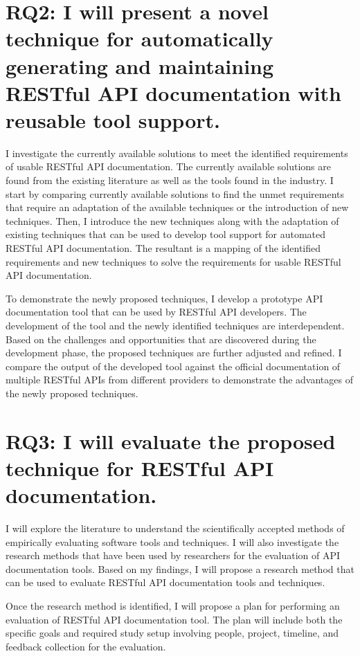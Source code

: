 \documentclass[11pt,oneside]{book}
\begin{document}
\section{RQ2: I will present a novel technique for automatically generating and maintaining RESTful API documentation with reusable tool support.}

I investigate the currently available solutions to meet the identified requirements of usable RESTful API documentation. The currently available solutions are found from the existing literature as well as the tools found in the industry. I start by comparing currently available solutions to find the unmet requirements that require an adaptation of the available techniques or the introduction of new techniques. Then, I introduce the new techniques along with the adaptation of existing techniques that can be used to develop tool support for automated RESTful API documentation. The resultant is a mapping of the identified requirements and new techniques to solve the requirements for usable RESTful API documentation.

To demonstrate the newly proposed techniques, I develop a prototype API documentation tool that can be used by RESTful API developers. The development of the tool and the newly identified techniques are interdependent. Based on the challenges and opportunities that are discovered during the development phase, the proposed techniques are further adjusted and refined. I compare the output of the developed tool against the official documentation of multiple RESTful APIs from different providers to demonstrate the advantages of the newly proposed techniques.

\section{RQ3: I will evaluate the proposed technique for RESTful API documentation.}

I will explore the literature to understand the scientifically accepted methods of empirically evaluating software tools and techniques. I will also investigate the research methods that have been used by researchers for the evaluation of API documentation tools. Based on my findings, I will propose a research method that can be used to evaluate RESTful API documentation tools and techniques.

Once the research method is identified, I will propose a plan for performing an evaluation of RESTful API documentation tool. The plan will include both the specific goals and required study setup involving people, project, timeline, and feedback collection for the evaluation.
\end{document}
